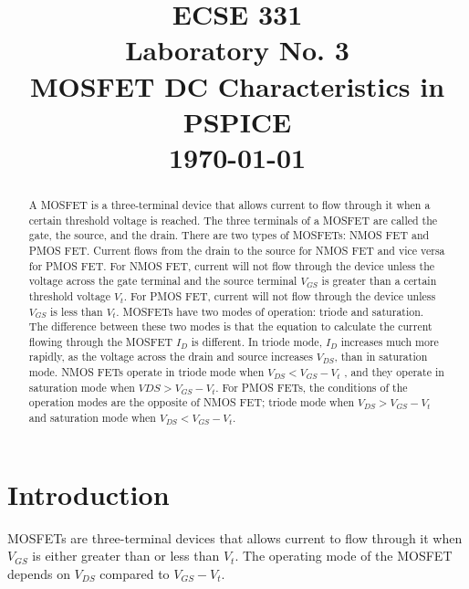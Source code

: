 \documentclass[conference]{IEEEtran}
\begin{document}
\title{ECSE 331\\
    Laboratory No. 3\\
    MOSFET DC Characteristics in PSPICE\\
    \Large \today\\
}

\author
{

    \and

}
\maketitle
\clearpage

\begin{abstract}
    A MOSFET is a three-terminal device that allows current to flow through it when a certain threshold voltage is reached. The three terminals of a MOSFET are called the gate, the source, and the drain. There are two types of MOSFETs: NMOS FET and PMOS FET. Current flows from the drain to the source for NMOS FET and vice versa for PMOS FET. For NMOS FET, current will not flow through the device unless the voltage across the gate terminal and the source terminal $V_{GS}$ is greater than a certain threshold voltage $V_{t}$. For PMOS FET, current will not flow through the device unless $V_{GS}$ is less than $V_{t}$.  MOSFETs have two modes of operation: triode and saturation. The difference between these two modes is that the equation to calculate the current flowing through the MOSFET $I_{D}$ is different. In triode mode, $I_{D}$ increases much more rapidly, as the voltage across the drain and source increases $V_{DS}$, than in saturation mode. NMOS FETs operate in triode mode when $V_{DS} < V_{GS} - V_{t}$ , and they operate in saturation mode when $V{DS} > V_{GS} - V_{t}$.  For PMOS FETs, the conditions of the operation modes are the opposite of NMOS FET; triode mode when $V_{DS} > V_{GS} - V_{t}$ and saturation mode when $V_{DS} < V_{GS} - V_{t}$.

\end{abstract}

\section{Introduction}
MOSFETs are three-terminal devices that allows current to flow through it when $V_{GS}$ is either greater than or less than $V_{t}$. The operating mode of the MOSFET depends on $V_{DS}$ compared to $V_{GS} - V_{t}$.
\end{document}

